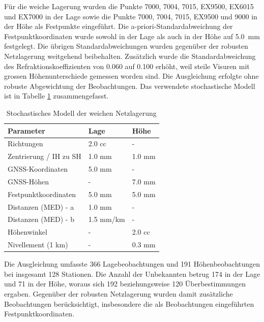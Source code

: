 Für die weiche Lagerung wurden die Punkte 7000, 7004, 7015, EX9500, EX6015 und EX7000 in der
Lage sowie die Punkte 7000, 7004, 7015, EX9500 und 9000 in der Höhe als Festpunkte eingeführt.
Die a-priori-Standardabweichung der Festpunktkoordinaten wurde sowohl in der Lage als auch in
der Höhe auf 5.0~mm festgelegt. Die übrigen Standardabweichungen wurden gegenüber der robusten
Netzlagerung weitgehend beibehalten. Zusätzlich wurde die Standardabweichung des
Refraktionskoeffizienten von 0.060 auf 0.100 erhöht, weil steile Visuren mit grossen Höhenunterschiede gemessen worden sind. Die Ausgleichung erfolgte ohne robuste
Abgewichtung der Beobachtungen. Das verwendete stochastische Modell ist in Tabelle \ref{tab:stochastisches-modell-weich} zusammengefasst.

\begin{table}[H]
    \centering
    \begin{tabularx}{\textwidth}{p{5.5cm} X X}
        \toprule
        Parameter & Lage & Höhe \\
        \midrule
        Richtungen & 2.0 cc & - \\
        \addlinespace
        Zentrierung / IH zu SH & 1.0 mm & 1.0 mm \\
        \addlinespace
        GNSS-Koordinaten & 5.0 mm & - \\
        \addlinespace
        GNSS-Höhen & - & 7.0 mm \\
        \addlinespace
        Festpunktkoordinaten & 5.0 mm & 5.0 mm \\
        \addlinespace
        Distanzen (MED) - a & 1.0 mm & - \\
        \addlinespace
        Distanzen (MED) - b & 1.5 mm/km & - \\
        \addlinespace
        Höhenwinkel & - & 2.0 cc \\
        \addlinespace
        Nivellement (1 km) & - & 0.3 mm \\
        \bottomrule
    \end{tabularx}
    \caption{Stochastisches Modell der weichen Netzlagerung}
    \label{tab:stochastisches-modell-weich}
\end{table}

Die Ausgleichung umfasste 366 Lagebeobachtungen und 191 Höhenbeobachtungen bei insgesamt
128 Stationen. Die Anzahl der Unbekannten betrug 174 in der Lage und 71 in der Höhe, woraus
sich 192 beziehungsweise 120 Überbestimmungen ergaben. Gegenüber der robusten Netzlagerung
wurden damit zusätzliche Beobachtungen berücksichtigt, insbesondere die als Beobachtungen
eingeführten Festpunktkoordinaten. \bigskip

